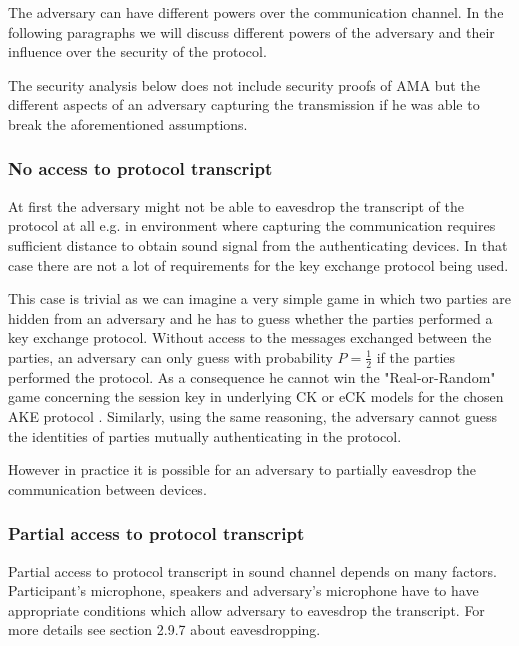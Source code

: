 \documentclass[11pt,titlepage]{article}
\theoremstyle{plain}
\begin{document}
The adversary can have different powers over the communication channel. In the following paragraphs we will discuss different powers of the adversary and their influence over the security of the protocol.

\vspace{5mm}

The security analysis below does not include security proofs of AMA but the different aspects of an adversary capturing the transmission if he was able to break the aforementioned assumptions.

\subsubsection{No access to protocol transcript}
At first the adversary might not be able to eavesdrop the transcript of the protocol at all e.g. in environment where capturing the communication requires sufficient distance to obtain sound signal from the authenticating devices. In that case there are not a lot of requirements for the key exchange protocol being used.

\vspace{5mm}

This case is trivial as we can imagine a very simple game in which two parties are hidden from an adversary and he has to guess whether the parties performed a key exchange protocol. Without access to the messages exchanged between the parties, an adversary can only guess with probability $P = \frac{1}{2}$ if the parties performed the protocol. As a consequence he cannot win the "Real-or-Random" game concerning the session key in underlying CK or eCK models for the chosen AKE protocol \cite{key_exchange, efficient_eck, security_canetti_krawczyk}. Similarly, using the same reasoning, the adversary cannot guess the identities of parties mutually authenticating in the protocol. 

\vspace{5mm}

However in practice it is possible for an adversary to partially eavesdrop the communication between devices.

\subsubsection{Partial access to protocol transcript}

Partial access to protocol transcript in sound channel depends on many factors. Participant's microphone, speakers and adversary's microphone have to have appropriate conditions which allow adversary to eavesdrop the transcript. For more details see section 2.9.7 about eavesdropping.
\end{document}
